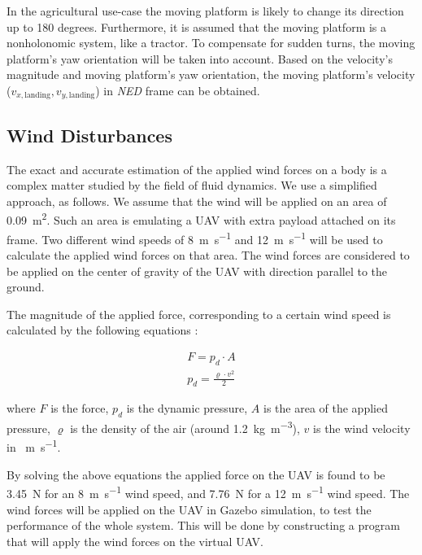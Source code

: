 \documentclass[conference, onecolumn, draftclsnofoot]{IEEEtran}
\begin{document}
In the agricultural use-case the moving platform is likely to change
its direction up to 180 degrees. Furthermore, it is assumed that the
moving platform is a nonholonomic system, like a tractor. To
compensate for sudden turns, the moving platform's yaw orientation
will be taken into account. Based on the velocity's magnitude and moving platform's yaw orientation, the
moving platform's velocity (\(v_{x,\textrm{landing}}, v_{y,\textrm{landing}}\)) in \emph{NED} frame can be obtained.





\subsection{Wind Disturbances}
\label{sec:WindDisturbances}

The exact and accurate estimation of the applied wind forces on a body
is a complex matter studied by the field of fluid dynamics. We use a
simplified approach, as follows. We assume that the wind will be
applied on an area of \SI{0.09}{\m^2}. Such an area is emulating a UAV
with extra payload attached on its frame. Two different wind speeds of
\SI{8}{\m \per \s} and \SI{12}{\m \per \s} will be used to calculate the applied wind forces
on that area. The wind forces are considered to be applied on the
center of gravity of the UAV with direction parallel to the ground.

The magnitude of the applied force, corresponding to a certain wind
speed is calculated by the following equations
\cite{Dynamic_pressure_NASA,anderson2010fundamentals}:

\begin{equation}
    \begin{array}{l}
         F = p_{d} \cdot A  \\
         p_{d} = \frac{\varrho \cdot v^2}{2} 
    \end{array}
\end{equation}

\noindent where $F$ is the force, \(p_{d}\) is the dynamic pressure, \(A\) is
the area of the applied pressure, \(\varrho\) is the density of the
air (around \SI{1.2}{\kg \per \m^3}), \(v\) is the wind velocity in \SI{}{\m \per \s}.

By solving the above equations the applied force on the UAV is found
to be \SI{3.45}{\newton} for an \SI{8}{\m \per \s} wind speed, and 
\SI{7.76}{\newton} for a \SI{12}{\m \per \s}
wind speed. The wind forces will be applied on the UAV in Gazebo
simulation, to test the performance of the whole system. This will be
done by constructing a program that will apply the wind forces on the
virtual UAV.
\end{document}
